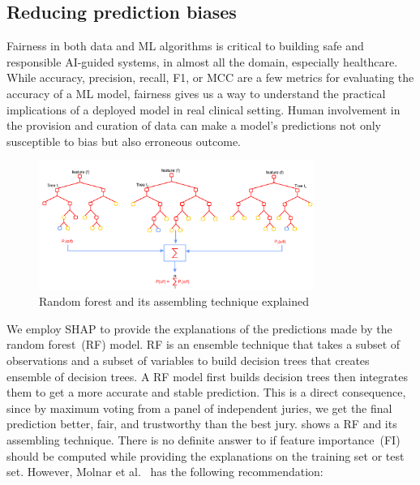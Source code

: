 \subsection{Reducing prediction biases}
Fairness in both data and ML algorithms is critical to building safe and responsible AI-guided systems, in almost all the domain, especially healthcare. While accuracy, precision, recall, F1, or MCC are a few metrics for evaluating the accuracy of a ML model, fairness gives us a way to understand the practical implications of a deployed model in real clinical setting. Human involvement in the provision and curation of data can make a model's predictions not only susceptible to bias but also erroneous outcome. 

\begin{figure}[h]
\centering
	\includegraphics[width=0.8\textwidth]{images/rf_tree.png}
	\caption{Random forest and its assembling technique explained~\cite{karim2018scala}} 
	\label{fig:RF_model}
\end{figure}

\hspace*{3.5mm}We employ SHAP to provide the explanations of the predictions made by the random forest~(RF) model. RF is an ensemble technique that takes a subset of observations and a subset of variables to build decision trees that creates ensemble of decision trees. A RF model first builds decision trees then integrates them to get a more accurate and stable prediction. This is a direct consequence, since by maximum voting from a panel of independent juries, we get the final prediction better, fair, and trustworthy than the best jury.  shows a RF and its assembling technique. There is no definite answer to if feature importance~(FI) should be computed while providing the explanations on the training set or test set. However, Molnar et al.~\cite{molnar2019interpretable} has the following recommendation: 

